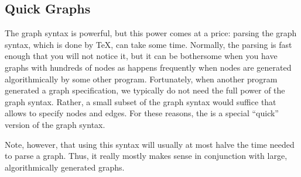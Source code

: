 \subsection{Quick Graphs}
\label{section-library-graphs-quick}

The graph syntax is powerful, but this power comes at a price: parsing the
graph syntax, which is done by \TeX, can take some time. Normally, the parsing
is fast enough that you will not notice it, but it can be bothersome when you
have graphs with hundreds of nodes as happens frequently when nodes are
generated algorithmically by some other program. Fortunately, when another
program generated a graph specification, we typically do not need the full
power of the graph syntax. Rather, a small subset of the graph syntax would
suffice that allows to specify nodes and edges. For these reasons, the is a
special ``quick'' version of the graph syntax.

Note, however, that using this syntax will usually at most halve the time
needed to parse a graph. Thus, it really mostly makes sense in conjunction with
large, algorithmically generated graphs.


